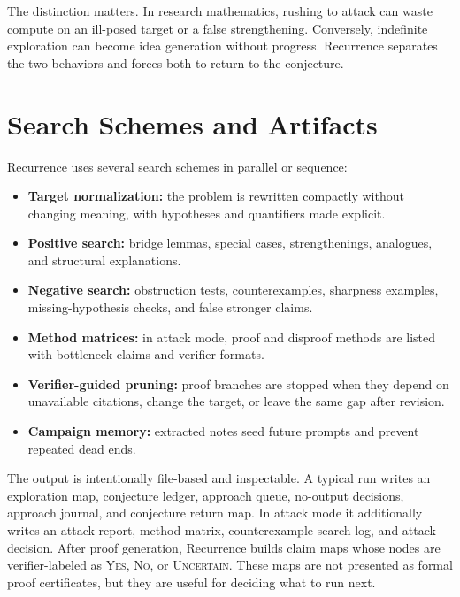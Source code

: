 \documentclass{article}
\theoremstyle{definition}
\theoremstyle{remark}
\begin{document}
The distinction matters. In research mathematics, rushing to attack can waste compute on an ill-posed target or a false strengthening. Conversely, indefinite exploration can become idea generation without progress. Recurrence separates the two behaviors and forces both to return to the conjecture.

\section{Search Schemes and Artifacts}

Recurrence uses several search schemes in parallel or sequence:
\begin{itemize}
  \item \textbf{Target normalization:} the problem is rewritten compactly without changing meaning, with hypotheses and quantifiers made explicit.
  \item \textbf{Positive search:} bridge lemmas, special cases, strengthenings, analogues, and structural explanations.
  \item \textbf{Negative search:} obstruction tests, counterexamples, sharpness examples, missing-hypothesis checks, and false stronger claims.
  \item \textbf{Method matrices:} in attack mode, proof and disproof methods are listed with bottleneck claims and verifier formats.
  \item \textbf{Verifier-guided pruning:} proof branches are stopped when they depend on unavailable citations, change the target, or leave the same gap after revision.
  \item \textbf{Campaign memory:} extracted notes seed future prompts and prevent repeated dead ends.
\end{itemize}

The output is intentionally file-based and inspectable. A typical run writes an exploration map, conjecture ledger, approach queue, no-output decisions, approach journal, and conjecture return map. In attack mode it additionally writes an attack report, method matrix, counterexample-search log, and attack decision. After proof generation, Recurrence builds claim maps whose nodes are verifier-labeled as \textsc{Yes}, \textsc{No}, or \textsc{Uncertain}. These maps are not presented as formal proof certificates, but they are useful for deciding what to run next.
\end{document}
